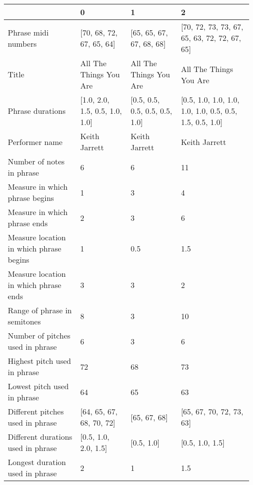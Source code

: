 \documentclass[11pt]{article}
\begin{document}
    \begin{tabular}{llll}
\toprule
{} &                                    0 &                                    1 &                                                        2 \\
\midrule
Phrase midi numbers                                           &  [70, 68, 72, 67, 65, 64] &  [65, 65, 67, 67, 68, 68] &  [70, 72, 73, 73, 67, 65, 63, 72, 72, 67, 65] \\
Title                                                         &  All The Things You Are &  All The Things You Are &  All The Things You Are \\
Phrase durations                                              &  [1.0, 2.0, 1.5, 0.5, 1.0, 1.0] &  [0.5, 0.5, 0.5, 0.5, 0.5, 1.0] &  [0.5, 1.0, 1.0, 1.0, 1.0, 1.0, 0.5, 0.5, 1.5, 0.5, 1.0] \\
Performer name                                                &  Keith Jarrett &  Keith Jarrett &  Keith Jarrett \\
Number of notes in phrase                                     &  6 &  6 &  11 \\
Measure in which phrase begins                                &  1 &  3 &  4 \\
Measure in which phrase ends                                  &  2 &  3 &  6 \\
Measure location in which phrase begins                       &  1 &  0.5 &  1.5 \\
Measure location in which phrase ends                         &  3 &  3 &  2 \\
Range of phrase in semitones                                  &  8 &  3 &  10 \\
Number of pitches used in phrase                              &  6 &  3 &  6 \\
Highest pitch used in phrase                                  &  72 &  68 &  73 \\
Lowest pitch used in phrase                                   &  64 &  65 &  63 \\
Different pitches used in phrase                              &  [64, 65, 67, 68, 70, 72] &  [65, 67, 68] &  [65, 67, 70, 72, 73, 63] \\
Different durations used in phrase                            &  [0.5, 1.0, 2.0, 1.5] &  [0.5, 1.0] &  [0.5, 1.0, 1.5] \\
Longest duration used in phrase                               &  2 &  1 &  1.5 \\

\end{tabular}
\end{document}
